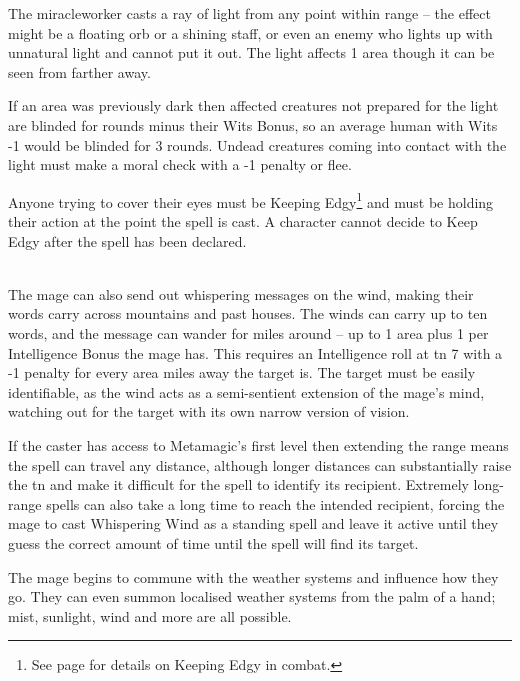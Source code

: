 \documentclass[titlepage,a4paper,openany]{book}
\begin{document}
\begin{multicols}{2}

The \gls{miracleworker} casts a ray of light from any point within range -- the effect might be a floating orb or a shining staff, or even an enemy who lights up with unnatural light and cannot put it out. The light affects 1 area though it can be seen from farther away.

If an area was previously dark then affected creatures not prepared for the light are blinded for  \glspl{round} minus their Wits Bonus, so an average human with Wits -1 would be blinded for 3 \glspl{round}. Undead creatures coming into contact with the light must make a moral check with a -1 penalty or flee.

Anyone trying to cover their eyes must be Keeping Edgy\footnote{See page \pageref{edgy} for details on Keeping Edgy in combat.} and must be holding their action at the point the spell is cast. A character cannot decide to Keep Edgy after the spell has been declared.

\\
The mage can also send out whispering messages on the wind, making their words carry across mountains and past houses.
The winds can carry up to ten words, and the message can wander for miles around -- up to 1 area plus 1 per Intelligence Bonus the mage has.
This requires an Intelligence roll at \gls{tn} 7 with a -1 penalty for every area miles away the target is.
The target must be easily identifiable, as the wind acts as a semi-sentient extension of the mage's mind, watching out for the target with its own narrow version of vision.

If the caster has access to Metamagic's first level then extending the range means the spell can travel any distance, although longer distances can substantially raise the \gls{tn} and make it difficult for the spell to identify its recipient. Extremely long-range spells can also take a long time to reach the intended recipient, forcing the mage to cast Whispering Wind as a standing spell and leave it active until they guess the correct amount of time until the spell will find its target.

\spelllevel

The mage begins to commune with the weather systems and influence how they go. They can even summon localised weather systems from the palm of a hand; mist, sunlight, wind and more are all possible.


\end{multicols}
\end{document}
